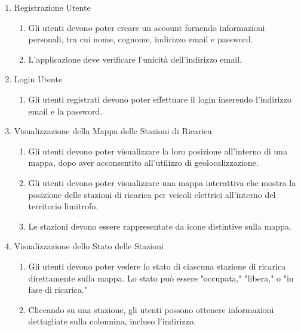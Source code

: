 \begin{enumerate}[label=\arabic*.]
    \item Registrazione Utente
          \begin{enumerate}[label=\arabic{enumi}.\arabic*]
              \item Gli utenti devono poter creare un account fornendo informazioni personali, tra cui nome, cognome, indirizzo email e password.
              \item L'applicazione deve verificare l'unicità dell'indirizzo email.
          \end{enumerate}

    \item Login Utente
          \begin{enumerate}[label=\arabic{enumi}.\arabic*]
              \item Gli utenti registrati devono poter effettuare il login inserendo l'indirizzo email e la password.
          \end{enumerate}

    \item Visualizzazione della Mappa delle Stazioni di Ricarica
          \begin{enumerate}[label=\arabic{enumi}.\arabic*]
              \item Gli utenti devono poter visualizzare la loro posizione all'interno di una mappa, dopo aver acconsentito all'utilizzo di geolocalizzazione.
              \item Gli utenti devono poter visualizzare una mappa interattiva che mostra la posizione delle stazioni di ricarica per veicoli elettrici all'interno del territorio limitrofo.
              \item Le stazioni devono essere rappresentate da icone distintive sulla mappa.
          \end{enumerate}

    \item Visualizzazione dello Stato delle Stazioni
          \begin{enumerate}[label=\arabic{enumi}.\arabic*]
              \item Gli utenti devono poter vedere lo stato di ciascuna stazione di ricarica direttamente sulla mappa. Lo stato può essere "occupata," "libera," o "in fase di ricarica."
              \item Cliccando su una stazione, gli utenti possono ottenere informazioni dettagliate sulla colonnina, incluso l'indirizzo.
          \end{enumerate}


\end{enumerate}
